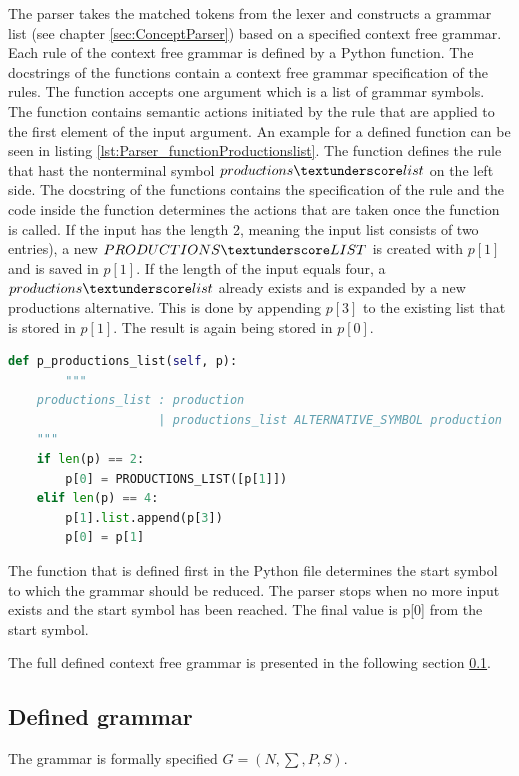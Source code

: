 The parser takes the matched tokens from the lexer and constructs a grammar list (see chapter \ref{sec:ConceptParser}) based on a specified context free grammar. Each rule of the context free grammar is defined by a Python function. The docstrings of the functions contain a context free grammar specification of the rules. The function accepts one argument which is a list of grammar symbols. The function contains semantic actions initiated by the rule that are applied to the first element of the input argument.
An example for a defined function can be seen in listing \ref{lst:Parser_functionProductionslist}. The function defines the rule that hast the nonterminal symbol $productions\textunderscore list$ on the left side. The docstring of the functions contains the specification of the rule and the code inside the function determines the actions that are taken once the function is called. If the input has the length 2, meaning the input list consists of two entries), a new $PRODUCTIONS\textunderscore LIST$ is created with $p[1]$ and is saved in $p[1]$. If the length of the input equals four, a $productions\textunderscore list$ already exists and is expanded by a new productions alternative. This is done by appending $p[3]$ to the existing list that is stored in $p[1]$. The result is again being stored in $p[0]$. \\

\begin{lstlisting}[language=Python,basicstyle=\scriptsize	,caption= Parser function of productions list,label= lst:Parser_functionProductionslist]
def p_productions_list(self, p):
		"""
    productions_list : production
                     | productions_list ALTERNATIVE_SYMBOL production
    """
    if len(p) == 2:
    	p[0] = PRODUCTIONS_LIST([p[1]])
    elif len(p) == 4:
        p[1].list.append(p[3])
        p[0] = p[1]
\end{lstlisting}

The function that is defined first in the Python file determines the start symbol to which the grammar should be reduced. The parser stops when no more input exists and the start symbol has been reached. The final value is p[0] from the start symbol. 

The full defined context free grammar is presented in the following section \ref{sec:ImplementationGrammar}.

\subsection{Defined grammar}\label{sec:ImplementationGrammar}
The grammar is formally specified $G = (N,\sum,P,S)$.

